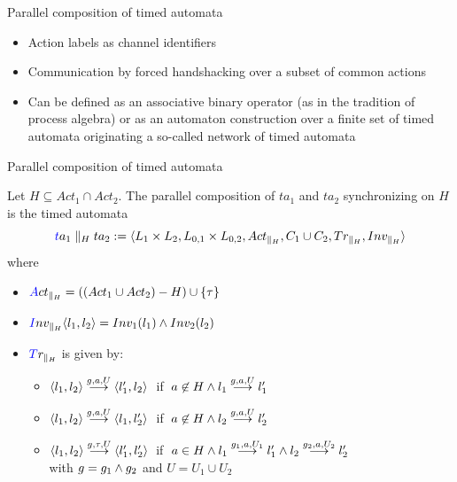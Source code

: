 \documentclass{beamer}
\def\dgold#1{{\darkgoldenrod #1}}
\def\dkb#1{{\blue #1}}
\begin{document}
\begin{slide}{Parallel composition of timed automata}
\small

\begin{itemize}
\item Action labels as \dkb{channel} identifiers
\item Communication by \dkb{forced handshacking} over a subset of common actions
\item Can be defined as an associative binary operator (as in the tradition of process algebra) or
as an automaton construction over a finite set of timed automata originating a so-called \dgold{network}
of timed automata
\end{itemize}

\end{slide}

\begin{slide}{Parallel composition of timed automata}
\small

Let $H \subseteq Act_1 \cap Act_2$. The parallel composition of $ta_1$ and  $ta_2$ synchronizing on $H$
is the timed automata
\begin{equation*}
\dkb{ta_1 \parallel_H ta_2 := \pair{L_1 \times L_2, L_{0,1} \times L_{0,2}, Act_{\parallel_H}, C_1 \cup C_2, Tr_{\parallel_H}, Inv_{\parallel_H}}}
\end{equation*}
where
\begin{itemize}
\item $\dkb{Act_{\parallel_H}} = ((Act_1 \cup Act_2) - H) \cup \enset{\tau}$
\item $\dkb{Inv_{\parallel_H}} \pair{l_1,l_2} = Inv_1(l_1) \e  Inv_2(l_2)$
\item $\dkb{Tr_{\parallel_H}}$ is given by:
\begin{itemize}
\item $\mathopen{\langle}l_1,l_2\mathclose{\rangle} \stackrel{g,a,U}{\longrightarrow} \mathopen{\langle}l'_1,l_2\mathclose{\rangle}\; $ if $\; a \not \in H \mathbin{\wedge}  l_1 \stackrel{g,a,U}{\longrightarrow} l'_1 $
\item $\mathopen{\langle}l_1,l_2\mathclose{\rangle} \stackrel{g,a,U}{\longrightarrow} \mathopen{\langle}l_1,l'_2\mathclose{\rangle}\; $ if $\; a \not \in H \mathbin{\wedge}   l_2 \stackrel{g,a,U}{\longrightarrow} l'_2$
\item $\mathopen{\langle}l_1,l_2\mathclose{\rangle} \stackrel{g,\tau,U}{\longrightarrow} \mathopen{\langle}l'_1,l'_2\mathclose{\rangle}\; $ if $\; a \in H \mathbin{\wedge}  l_1 \stackrel{g_1,a,U_1}{\longrightarrow} l'_1 \mathbin{\wedge} l_2 \stackrel{g_2,a,U_2}{\longrightarrow} l'_2$\\
with $g = g_1 \mathbin{\wedge} g_2$ and $U = U_1 \cup U_2$
\end{itemize}
\end{itemize}
\end{slide}
\end{document}
